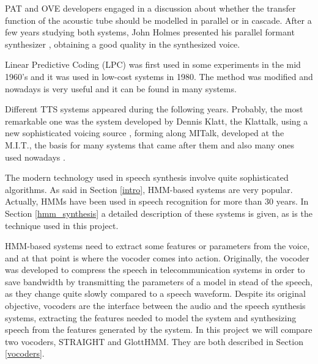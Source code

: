 PAT and OVE developers engaged in a discussion about whether the transfer function of the acoustic tube should be modelled in parallel or in cascade. After a few years studying both systems, John Holmes presented his parallel formant synthesizer \cite{Klatt87}, obtaining a good quality in the synthesized voice.

Linear Predictive Coding (LPC) was first used in some experiments in the mid 1960's \cite{Schroeder93} and it was used in low-cost systems in 1980. The method was modified and nowadays is very useful and it can be found in many systems. 

Different TTS systems appeared during the following years. Probably, the most remarkable one was the system developed by Dennis Klatt, the Klattalk, using a new sophisticated voicing source \cite{Klatt87}, forming along MITalk, developed at the M.I.T., the basis for many systems that came after them and also many ones used nowadays \cite{LemmettyMSc}.

The modern technology used in speech synthesis involve quite sophisticated algorithms. As said in Section \ref{intro}, HMM-based systems are very popular. Actually, HMMs have been used in speech recognition for more than 30 years. In Section \ref{hmm_synthesis} a detailed description of these systems is given, as is the technique used in this project.

HMM-based systems need to extract some features or parameters from the voice, and at that point is where the vocoder comes into action. Originally, the vocoder was developed to compress the speech in telecommunication systems in order to save bandwidth by transmitting the parameters of a model in stead of the speech, as they change quite slowly compared to a speech waveform. Despite its original objective, vocoders are the interface between the audio and the speech synthesis systems, extracting the features needed to model the system and synthesizing speech from the features generated by the system. In this project we will compare two vocoders, STRAIGHT and GlottHMM. They are both described in Section \ref{vocoders}. 
